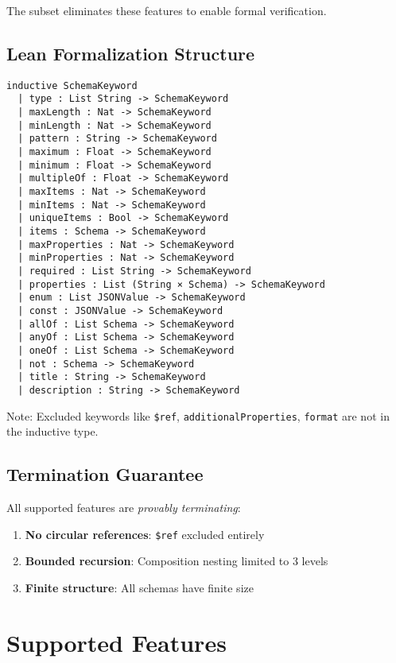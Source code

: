 The subset eliminates these features to enable formal verification.

\subsection{Lean Formalization Structure}

\begin{verbatim}
inductive SchemaKeyword
  | type : List String -> SchemaKeyword
  | maxLength : Nat -> SchemaKeyword
  | minLength : Nat -> SchemaKeyword
  | pattern : String -> SchemaKeyword
  | maximum : Float -> SchemaKeyword
  | minimum : Float -> SchemaKeyword
  | multipleOf : Float -> SchemaKeyword
  | maxItems : Nat -> SchemaKeyword
  | minItems : Nat -> SchemaKeyword
  | uniqueItems : Bool -> SchemaKeyword
  | items : Schema -> SchemaKeyword
  | maxProperties : Nat -> SchemaKeyword
  | minProperties : Nat -> SchemaKeyword
  | required : List String -> SchemaKeyword
  | properties : List (String × Schema) -> SchemaKeyword
  | enum : List JSONValue -> SchemaKeyword
  | const : JSONValue -> SchemaKeyword
  | allOf : List Schema -> SchemaKeyword
  | anyOf : List Schema -> SchemaKeyword
  | oneOf : List Schema -> SchemaKeyword
  | not : Schema -> SchemaKeyword
  | title : String -> SchemaKeyword
  | description : String -> SchemaKeyword
\end{verbatim}

Note: Excluded keywords like \texttt{\$ref}, \texttt{additionalProperties}, \texttt{format} are not in the inductive type.

\subsection{Termination Guarantee}

All supported features are \emph{provably terminating}:

\begin{enumerate}
  \item \textbf{No circular references}: \texttt{\$ref} excluded entirely
  \item \textbf{Bounded recursion}: Composition nesting limited to 3 levels
  \item \textbf{Finite structure}: All schemas have finite size
\end{enumerate}

\section{Supported Features}

